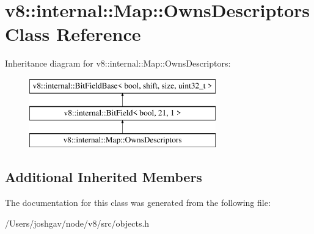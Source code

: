 \hypertarget{classv8_1_1internal_1_1_map_1_1_owns_descriptors}{}\section{v8\+:\+:internal\+:\+:Map\+:\+:Owns\+Descriptors Class Reference}
\label{classv8_1_1internal_1_1_map_1_1_owns_descriptors}
Inheritance diagram for v8\+:\+:internal\+:\+:Map\+:\+:Owns\+Descriptors\+:\begin{figure}[H]
\begin{center}
\leavevmode
\includegraphics[height=3.000000cm]{classv8_1_1internal_1_1_map_1_1_owns_descriptors}
\end{center}
\end{figure}
\subsection*{Additional Inherited Members}


The documentation for this class was generated from the following file\+:\begin{DoxyCompactItemize}
\item 
/\+Users/joshgav/node/v8/src/objects.\+h\end{DoxyCompactItemize}
